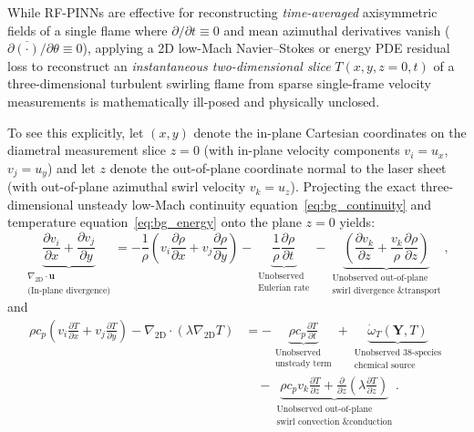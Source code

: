 While RF-PINNs are effective for reconstructing \emph{time-averaged} axisymmetric fields of a single flame where $\partial/\partial t \equiv 0$ and mean azimuthal derivatives vanish ($\partial \overline{(\cdot)} / \partial \theta \equiv 0$), applying a 2D low-Mach Navier--Stokes or energy PDE residual loss to reconstruct an \emph{instantaneous two-dimensional slice} $T(x, y, z=0, t)$ of a three-dimensional turbulent swirling flame from sparse single-frame velocity measurements is mathematically ill-posed and physically unclosed.

To see this explicitly, let $(x, y)$ denote the in-plane Cartesian coordinates on the diametral measurement slice $z = 0$ (with in-plane velocity components $v_i = u_x$, $v_j = u_y$) and let $z$ denote the out-of-plane coordinate normal to the laser sheet (with out-of-plane azimuthal swirl velocity $v_k = u_z$). Projecting the exact three-dimensional unsteady low-Mach continuity equation~\eqref{eq:bg_continuity} and temperature equation~\eqref{eq:bg_energy} onto the plane $z = 0$ yields:
\begin{equation}
    \underbrace{\frac{\partial v_i}{\partial x} + \frac{\partial v_j}{\partial y}}_{\substack{\nabla_{\text{2D}} \cdot \mathbf{u} \\ \text{(In-plane divergence)}}} = -\frac{1}{\rho}\left(v_i \frac{\partial \rho}{\partial x} + v_j \frac{\partial \rho}{\partial y}\right) - \underbrace{\frac{1}{\rho}\frac{\partial \rho}{\partial t}}_{\substack{\text{Unobserved} \\ \text{Eulerian rate}}} - \underbrace{\left(\frac{\partial v_k}{\partial z} + \frac{v_k}{\rho}\frac{\partial \rho}{\partial z}\right)}_{\substack{\text{Unobserved out-of-plane} \\ \text{swirl divergence \& transport}}},
    \label{eq:bg_2d_continuity_unclosed}
\end{equation}
and
\begin{equation}
\begin{aligned}
    \rho c_p \left(v_i \frac{\partial T}{\partial x} + v_j \frac{\partial T}{\partial y}\right) - \nabla_{\text{2D}} \cdot (\lambda \nabla_{\text{2D}} T) &= -\underbrace{\rho c_p \frac{\partial T}{\partial t}}_{\substack{\text{Unobserved} \\ \text{unsteady term}}} + \underbrace{\dot{\omega}_T(\mathbf{Y}, T)}_{\substack{\text{Unobserved 38-species} \\ \text{chemical source}}} \\
    &\quad - \underbrace{\rho c_p v_k \frac{\partial T}{\partial z} + \frac{\partial}{\partial z}\!\left(\lambda \frac{\partial T}{\partial z}\right)}_{\substack{\text{Unobserved out-of-plane} \\ \text{swirl convection \& conduction}}}.
\end{aligned}
\label{eq:bg_2d_energy_unclosed}
\end{equation}

